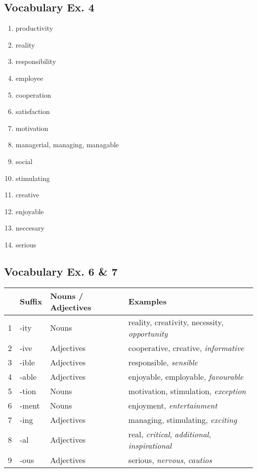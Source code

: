 \documentclass[12pt, a4paper, oneside]{article}
\begin{document}
  \subsection{Vocabulary Ex. 4}
  \begin{enumerate}[1.]
    \item productivity
    \item reality
    \item responsibility
    \item employee
    \item cooperation
    \item satisfaction
    \item motivation
    \item managerial, managing, managable
    \item social
    \item stimulating
    \item creative
    \item enjoyable
    \item neccesary
    \item serious
  \end{enumerate}

  \subsection{Vocabulary Ex. 6 \& 7}
  \begin{center}
    \begin{tabular}{|l|l|l|l|}
      \hline
      & Suffix & Nouns / Adjectives & Examples \\ \hline
      1 & -ity & Nouns & reality, creativity, necessity, \textit{opportunity} \\ \hline
      2 & -ive & Adjectives & cooperative, creative, \textit{informative} \\ \hline
      3 & -ible & Adjectives & responsible, \textit{sensible} \\ \hline
      4 & -able & Adjectives & enjoyable, employable, \textit{favourable} \\ \hline
      5 & -tion & Nouns & motivation, stimulation, \textit{exception} \\ \hline
      6 & -ment & Nouns & enjoyment, \textit{entertainment} \\ \hline
      7 & -ing & Adjectives & managing, stimulating, \textit{exciting} \\ \hline
      8 & -al & Adjectives & real, \textit{critical}, \textit{additional}, \textit{inspirational} \\ \hline
      9 & -ous & Adjectives & serious, \textit{nervous}, \textit{cautios} \\ \hline
    \end{tabular}
  \end{center}
\end{document}
